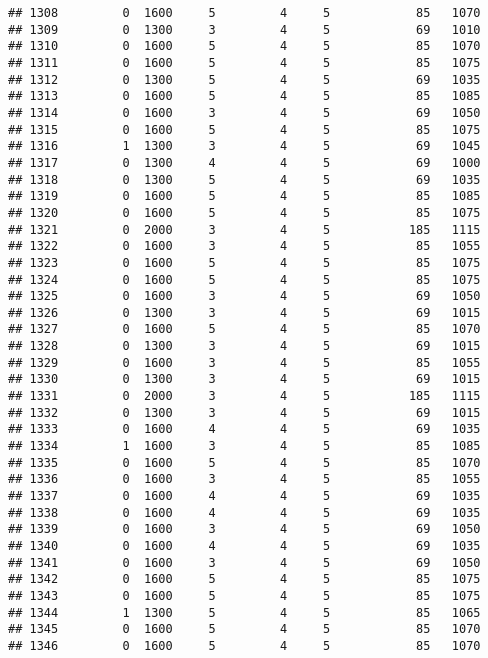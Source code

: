 \documentclass[]{article}
\begin{document}
\begin{verbatim}
## 1308         0  1600     5         4     5            85   1070
## 1309         0  1300     3         4     5            69   1010
## 1310         0  1600     5         4     5            85   1070
## 1311         0  1600     5         4     5            85   1075
## 1312         0  1300     5         4     5            69   1035
## 1313         0  1600     5         4     5            85   1085
## 1314         0  1600     3         4     5            69   1050
## 1315         0  1600     5         4     5            85   1075
## 1316         1  1300     3         4     5            69   1045
## 1317         0  1300     4         4     5            69   1000
## 1318         0  1300     5         4     5            69   1035
## 1319         0  1600     5         4     5            85   1085
## 1320         0  1600     5         4     5            85   1075
## 1321         0  2000     3         4     5           185   1115
## 1322         0  1600     3         4     5            85   1055
## 1323         0  1600     5         4     5            85   1075
## 1324         0  1600     5         4     5            85   1075
## 1325         0  1600     3         4     5            69   1050
## 1326         0  1300     3         4     5            69   1015
## 1327         0  1600     5         4     5            85   1070
## 1328         0  1300     3         4     5            69   1015
## 1329         0  1600     3         4     5            85   1055
## 1330         0  1300     3         4     5            69   1015
## 1331         0  2000     3         4     5           185   1115
## 1332         0  1300     3         4     5            69   1015
## 1333         0  1600     4         4     5            69   1035
## 1334         1  1600     3         4     5            85   1085
## 1335         0  1600     5         4     5            85   1070
## 1336         0  1600     3         4     5            85   1055
## 1337         0  1600     4         4     5            69   1035
## 1338         0  1600     4         4     5            69   1035
## 1339         0  1600     3         4     5            69   1050
## 1340         0  1600     4         4     5            69   1035
## 1341         0  1600     3         4     5            69   1050
## 1342         0  1600     5         4     5            85   1075
## 1343         0  1600     5         4     5            85   1075
## 1344         1  1300     5         4     5            85   1065
## 1345         0  1600     5         4     5            85   1070
## 1346         0  1600     5         4     5            85   1070

\end{verbatim}
\end{document}
